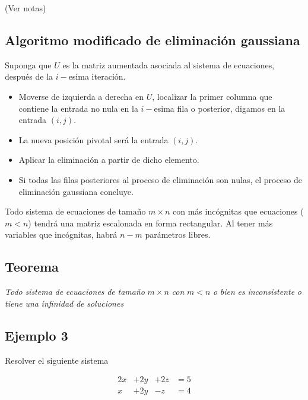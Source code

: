 \documentclass[
]{article}
\begin{document}
(Ver notas)

\hypertarget{algoritmo-modificado-de-eliminaciuxf3n-gaussiana}{%
\subsection{Algoritmo modificado de eliminación
gaussiana}\label{algoritmo-modificado-de-eliminaciuxf3n-gaussiana}}

Suponga que \(U\) es la matriz aumentada asociada al sistema de
ecuaciones, después de la \(i-\)esima iteración.

\begin{itemize}
\item
  Moverse de izquierda a derecha en \(U\), localizar la primer columna
  que contiene la entrada no nula en la \(i-\)esima fila o posterior,
  digamos en la entrada \((i,j)\).
\item
  La nueva posición pivotal será la entrada \((i,j)\).
\item
  Aplicar la eliminación a partir de dicho elemento.
\item
  Si todas las filas posteriores al proceso de eliminación son nulas, el
  proceso de eliminación gaussiana concluye.
\end{itemize}

Todo sistema de ecuaciones de tamaño \(m\times n\) con más incógnitas
que ecuaciones (\(m<n\)) tendrá una matriz escalonada en forma
rectangular. Al tener más variables que incógnitas, habrá \(n-m\)
parámetros libres.

\hypertarget{teorema-1}{%
\subsection{Teorema}\label{teorema-1}}

\emph{Todo} \emph{sistema} \emph{de} \emph{ecuaciones} \emph{de}
\emph{tamaño} \(m\times n\) \emph{con} \(m<n\) \emph{o} \emph{bien}
\emph{es} \emph{inconsistente} \emph{o} \emph{tiene} \emph{una}
\emph{infinidad} \emph{de} \emph{soluciones}

\hypertarget{ejemplo-3-1}{%
\subsection{Ejemplo 3}\label{ejemplo-3-1}}

Resolver el siguiente sistema

\begin{equation*}
  \begin{matrix}
        2x   &  +2y & +2z & = 5  \\
         x   &  +2y & -z  & = 4
  \end{matrix}
\end{equation*}
\end{document}
